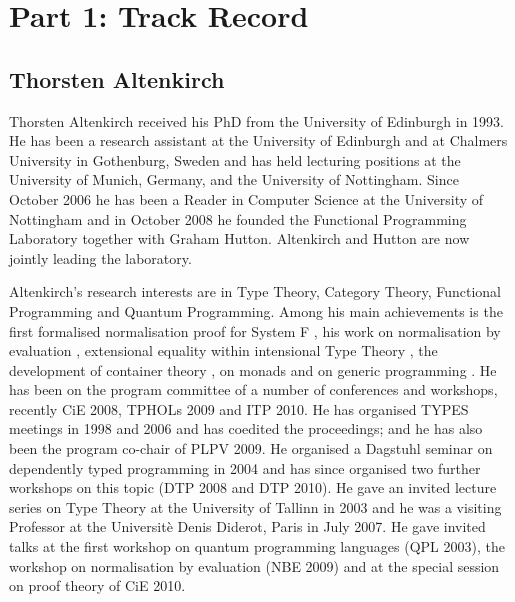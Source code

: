 \documentclass[a4paper]{article}
\newcommand{\citetrack}[1]{\cite{#1}}
\begin{document}
\section*{Part 1: Track Record}

\subsection*{Thorsten Altenkirch}
Thorsten Altenkirch received his PhD from the University of
Edinburgh in 1993. He has been a research assistant at the University of
Edinburgh and at Chalmers University in Gothenburg, Sweden and has
held lecturing positions at the University of Munich, Germany, and the
University of Nottingham. Since October 2006 he has been a Reader in
Computer Science at the University of Nottingham and in October
2008 he founded the Functional Programming Laboratory together with
Graham Hutton. Altenkirch and Hutton are now jointly leading the
laboratory.

Altenkirch's research interests are in Type Theory, Category Theory, Functional
Programming and Quantum Programming. 
Among his main achievements is
the first formalised normalisation proof for System F
\citetrack{alti:tlca93}
, his work on normalisation by evaluation 
\citetrack{alti:lics01}%
, extensional equality within intensional Type Theory \citetrack{alti:lics99}
, the development of container theory \citetrack{alti:cont-tcs}%
, on
monads \citetrack{alti:fossacs10} 
and on generic programming 
\citetrack{alti:wcgp02}
.
He has been on the program committee of a number of conferences and
workshops, recently CiE 2008, TPHOLs 2009 and ITP 2010. He has
organised TYPES meetings in 1998 and 2006 and has coedited the
proceedings; and he has also been the program co-chair of PLPV 2009.  He
organised a Dagstuhl seminar on dependently typed programming in 2004
and has since organised two further workshops on this topic (DTP 2008
and DTP 2010). He gave an invited lecture series on Type Theory at the
University of Tallinn in 2003 and he was a visiting Professor at the
Universit\`{e} Denis Diderot, Paris in  July 2007. He gave invited talks
at the first workshop on quantum programming languages (QPL 2003), the
workshop on normalisation by evaluation (NBE 2009) and at the special
session on proof theory of CiE 2010.

\end{document}
